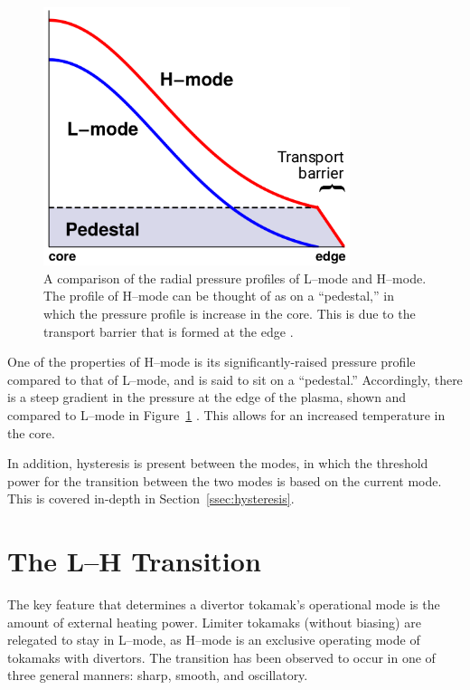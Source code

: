 \begin{figure}[tb] %
\begin{minipage}{0.49\linewidth}
	\centering
	\includegraphics[width=0.8\textwidth]{../Graphics/L-mode_H-mode_compare.png}
\end{minipage}
\hfill
\begin{minipage}{0.49\linewidth}
	\caption{A comparison of the radial pressure profiles of L--mode and H--mode.
	The profile of H--mode can be thought of as on a ``pedestal,'' in which the pressure profile is increase in the core.
	This is due to the transport barrier that is formed at the edge \cite{weymiens_bifurcation_2014}.}
	\label{fig:L-mode_H-mode_compare}
\end{minipage}
\end{figure}

One of the properties of H--mode is its significantly-raised pressure profile compared to that of L--mode, and is said to sit on a ``pedestal.''
Accordingly, there is a steep gradient in the pressure at the edge of the plasma, shown and compared to L--mode in Figure~\ref{fig:L-mode_H-mode_compare} \cite{weymiens_bifurcation_2014}.
This allows for an increased temperature in the core.

In addition, hysteresis is present between the modes, in which the threshold power for the transition between the two modes is based on the current mode.
This is covered in-depth in Section~\ref{ssec:hysteresis}.

\section{The L--H Transition}\label{sec:the_transition}
The key feature that determines a divertor tokamak's operational mode is the amount of external heating power.
Limiter tokamaks (without biasing) are relegated to stay in L--mode, as H--mode is an exclusive operating mode of tokamaks with divertors.
The transition has been observed to occur in one of three general manners: sharp, smooth, and oscillatory.

